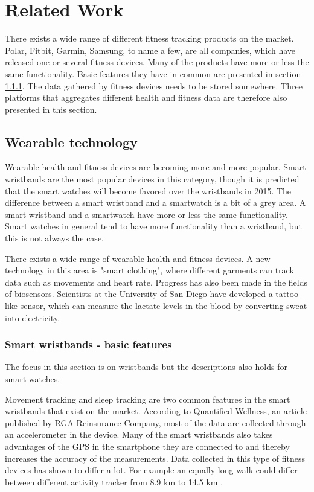 \documentclass{cslthse-msc}
\begin{document}
\chapter[Related Work]{Related Work}

There exists a wide range of different fitness tracking products on the market. Polar, Fitbit, Garmin, Samsung, to name a few, are all companies, which have released one or several fitness devices. Many of the products have more or less the same functionality. Basic features they have in common are presented in section \ref{sec:Wearable}. The data gathered by fitness devices needs to be stored somewhere. Three platforms that aggregates different health and fitness data are therefore also presented in this section.

\section{Wearable technology}

Wearable health and fitness devices are becoming more and more popular. Smart wristbands are the most popular devices  in this category, though it is predicted that the smart watches will become favored over the wristbands in 2015\cite{gartner}. The difference between a smart wristband and a smartwatch is a bit of a grey area. A smart wristband and a smartwatch have more or less the same functionality. Smart watches in general tend to have more functionality than a wristband, but this is not always the case. 

There exists a wide range of wearable health and fitness devices. A new technology in this area is "smart clothing", where different garments can track data such as movements and heart rate\cite{callaway2015quantified}. Progress has also been made in the fields of biosensors. Scientists at the University of San Diego have developed a tattoo-like sensor, which can measure the lactate levels in the blood by converting sweat into electricity\cite{tattoo-device}.



\subsection{Smart wristbands - basic features}
\label{sec:Wearable}
The focus in this section is on wristbands but the descriptions also holds for smart watches.

Movement tracking and sleep tracking are two common features in the smart wristbands that exist on the market. According to Quantified Wellness, an article published by RGA Reinsurance Company\cite{callaway2015quantified}, most of the data are collected through an accelerometer in the device. Many of the smart wristbands also takes advantages of the GPS in the smartphone they are connected to and thereby increases the accuracy of the measurements. Data collected in this type of fitness devices has shown to differ a lot. For example an equally long walk could differ between different activity tracker from 8.9 km to 14.5 km \cite{wearable-technology-cannot-be-trusted}.
\end{document}
